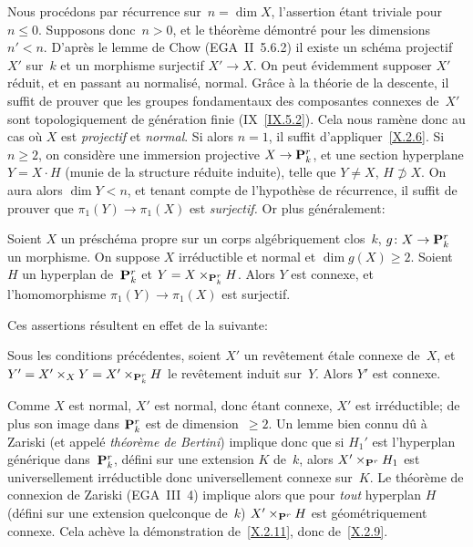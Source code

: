 Nous
proc\'edons par r\'ecurrence sur~$n=\dim X$, l'assertion
\'etant triviale pour~$n\le 0$. Supposons donc~$n>0$, et le
th\'eor\`eme d\'emontr\'e pour les
dimensions~$n'<n$. D'apr\`es le lemme de Chow (EGA~II~5.6.2) il
existe un sch\'ema projectif $X'$ sur~$k$ et un morphisme surjectif
$X'\to X$. On peut \'evidemment supposer $X'$ r\'eduit, et en
passant au normalis\'e, normal. Gr\^ace \`a la th\'eorie de
la descente, il suffit de prouver que les groupes fondamentaux des
composantes connexes de~$X'$ sont topologiquement de
g\'en\'eration finie (IX~\ref{IX.5.2}). Cela nous ram\`ene
donc au cas o\`u $X$ est \emph{projectif} et \emph{normal}. Si
alors $n=1$, il suffit d'appliquer~\ref{X.2.6}. Si $n\ge 2$, on
consid\`ere une immersion projective $X\to \PP_k^r$, et une section
hyperplane $Y=X\cdot H$
(munie
de la structure r\'eduite induite), telle que
$Y\ne X$,
\ie $H\not\supset X$. On aura alors $\dim Y<n$, et tenant compte de
l'hypoth\`ese de r\'ecurrence, il suffit de prouver que
$\pi_1(Y)\to \pi_1(X)$ est \emph{surjectif.} Or plus
g\'en\'eralement:

\begin{lemme}
\label{X.2.10}
Soient $X$ un pr\'esch\'ema propre sur un corps alg\'ebriquement
clos~$k$, $g\colon X\to \PP_k^r$ un morphisme. On suppose $X$
irr\'eductible et normal et $\dim g(X)\ge 2$. Soient $H$ un
hyperplan de~$\mathbf{P}_k^r$ et $Y=X\times_{\mathbf{P}_k^r} H$. Alors $Y$ est
connexe, et l'homomorphisme $\pi_1(Y)\to\pi_1(X)$ est surjectif.
\end{lemme}

Ces assertions r\'esultent en effet de la suivante:

\begin{corollaire}
\label{X.2.11}
Sous les conditions pr\'ec\'edentes, soient $X'$ un rev\^etement
\'etale connexe de~$X$, et $Y'=X'\times_X Y=X'\times_{\mathbf{P}_k^r} H$ le
rev\^etement induit sur~$Y$. Alors $Y'$ est connexe.
\end{corollaire}

Comme $X$ est normal, $X'$ est normal, donc \'etant connexe, $X'$
est irr\'eductible; de plus son image dans $\mathbf{P}_k^r$ est de
dimension~$\ge 2$. Un lemme bien connu d\^u \`a Zariski (et
appel\'e \og \emph{théorème de Bertini}\fg) implique donc que
si $H_1'$ est l'hyperplan g\'en\'erique dans~$\mathbf{P}_k^r$,
d\'efini sur une extension $K$ de~$k$, alors $X'\times_{\mathbf{P}^r} H_1$
est universellement irr\'eductible donc universellement connexe
sur~$K$. Le th\'eor\`eme de connexion de Zariski (EGA~III~4)
implique alors que pour \emph{tout} hyperplan $H$ (d\'efini sur une
extension quelconque de~$k$) $X'\times_{\mathbf{P}^r} H$ est
g\'eom\'etriquement connexe. Cela ach\`eve la d\'emonstration
de~\ref{X.2.11}, donc de~\ref{X.2.9}.

